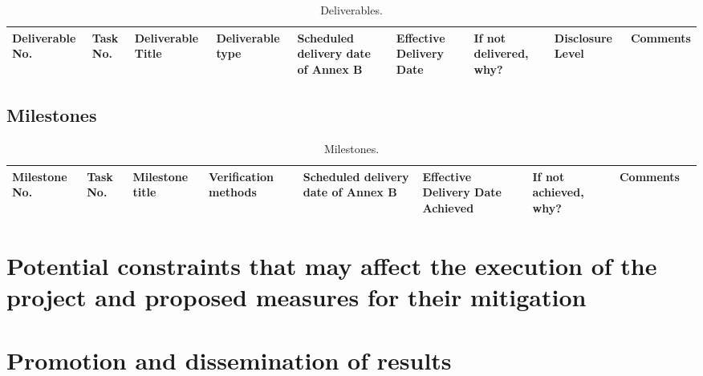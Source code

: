 \documentclass{ani}
\begin{document}
  \newpage
  \begin{landscape}
    
    \begin{table}
      \centering
      \scriptsize
      \begin{tabular}{|p{}|p{}|p{}|p{}|p{}|p{}|p{}|p{}|p{}|}
        \hline
        Deliverable No. & Task No. & Deliverable Title & Deliverable type & Scheduled delivery date of Annex B & Effective Delivery Date & If not delivered, why? & Disclosure Level & Comments \\ \hline
      \end{tabular}
      \caption{Deliverables.}
    \end{table}
  \end{landscape}
  
  \newpage
  \subsection{Milestones}
  \lipsum[10-12]

  \newpage
  \begin{landscape}
    \begin{table}
      \center
      \scriptsize
      \begin{tabular}{|p{}|p{}|p{}|p{}|p{}|p{}|p{}|p{}|p{}|}
        \hline
        Milestone No. & Task No. & Milestone title & Verification methods & Scheduled delivery date of Annex B & Effective Delivery Date Achieved & If not achieved, why? & Comments \\ \hline
      \end{tabular}
      \caption{Milestones.}
    \end{table}
  \end{landscape}
  \newpage

\section{Potential constraints that may affect the execution of the project and proposed measures for their mitigation}
\lipsum[13-20]

\section{Promotion and dissemination of results}
\lipsum[20-24]
\end{document}
